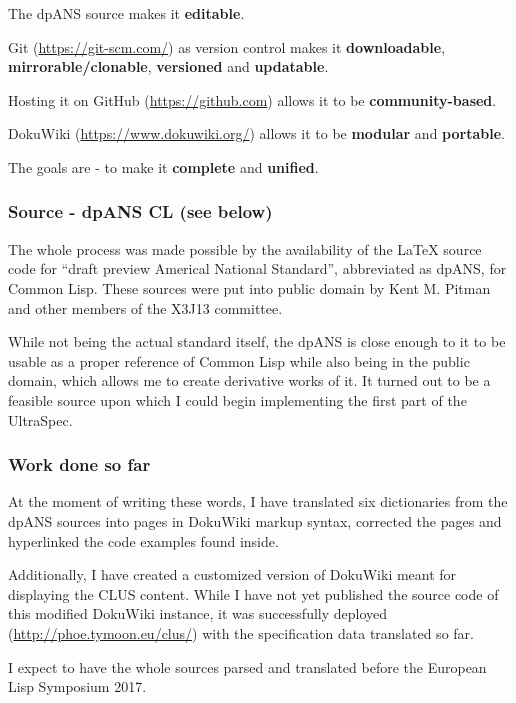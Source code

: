 \begin{enumerate}
  The dpANS source makes it \textbf{editable}.

  Git (\url{https://git-scm.com/}) as version control makes it
  \textbf{downloadable}, \textbf{mirrorable/clonable},
  \textbf{versioned} and \textbf{updatable}.

  Hosting it on GitHub (\url{https://github.com}) allows it to be
  \textbf{community-based}.

  DokuWiki (\url{https://www.dokuwiki.org/}) allows it to be
  \textbf{modular} and \textbf{portable}.

  The goals are - to make it \textbf{complete} and \textbf{unified}.
\end{enumerate}

\subsubsection{Source - dpANS CL (see
below)}\label{source---dpans-cl-see-below}

The whole process was made possible by the availability of the LaTeX
source code for ``draft preview Americal National Standard'',
abbreviated as dpANS, for Common Lisp. These sources were put into
public domain by Kent M. Pitman and other members of the X3J13
committee.

While not being the actual standard itself, the dpANS is close enough to
it to be usable as a proper reference of Common Lisp while also being in
the public domain, which allows me to create derivative works of it. It
turned out to be a feasible source upon which I could begin implementing
the first part of the UltraSpec.

\subsubsection{Work done so far}\label{work-done-so-far}

At the moment of writing these words, I have translated six dictionaries
from the dpANS sources into pages in DokuWiki markup syntax, corrected
the pages and hyperlinked the code examples found inside.

Additionally, I have created a customized version of DokuWiki meant for
displaying the CLUS content. While I have not yet published the source
code of this modified DokuWiki instance, it was successfully deployed
(\url{http://phoe.tymoon.eu/clus/}) with the specification data
translated so far.

I expect to have the whole sources parsed and translated before the
European Lisp Symposium 2017.

